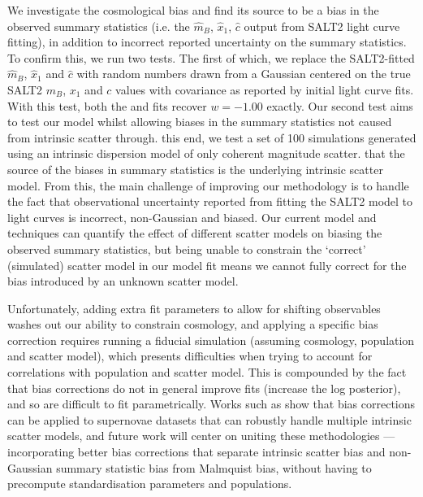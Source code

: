 \documentclass[twocolumn,trackchanges,tighten]{aastex62}
\newcommand{\gten}{\citetalias{Guy2010}}
\newcommand{\celeven}{\citetalias{Chotard2011}}
\begin{document}
We investigate the cosmological bias and find its source to be a bias in the observed summary statistics (i.e. the $\hat{m}_B$, $\hat{x}_1$, $\hat{c}$ output from SALT2 light curve fitting), in addition to incorrect reported uncertainty on the summary statistics. To confirm this, we run two tests. The first of which, we replace the SALT2-fitted $\hat{m}_B$, $\hat{x}_1$ and $\hat{c}$ with random numbers drawn from a Gaussian centered on the true SALT2 $m_B$, $x_1$ and $c$ values with covariance as reported by initial light curve fits. With this test, both the {\gten} and {\celeven} fits recover $w=-1.00$ exactly. Our second test aims to test our model whilst allowing biases in the summary statistics not caused from intrinsic scatter through.  this end, we test a set of 100 simulations generated using an intrinsic dispersion model of only coherent magnitude scatter.  that the source of the biases in summary statistics is the underlying intrinsic scatter model. From this, the main challenge of improving our methodology is to handle the fact that observational uncertainty reported from fitting the SALT2 model to light curves is incorrect, non-Gaussian and biased. Our current model and techniques can quantify the effect of different scatter models on biasing the observed summary statistics, but being unable to constrain the `correct' (simulated) scatter model in our model fit means we cannot fully correct for the bias introduced by an unknown scatter model. 

Unfortunately, adding extra fit parameters to allow for shifting observables washes out our ability to constrain cosmology, and applying a specific bias correction requires running a fiducial simulation (assuming cosmology, population and scatter model), which presents difficulties when trying to account for correlations with population and scatter model. This is compounded by the fact that bias corrections do not in general improve fits (increase the log posterior), and so are difficult to fit parametrically. Works such as \citet{Kessler2017} show that bias corrections can be applied to supernovae datasets that can robustly handle multiple intrinsic scatter models, and future work will center on uniting these methodologies --- incorporating better bias corrections that separate intrinsic scatter bias and non-Gaussian summary statistic bias from Malmquist bias, without having to precompute standardisation parameters and populations.
\end{document}
